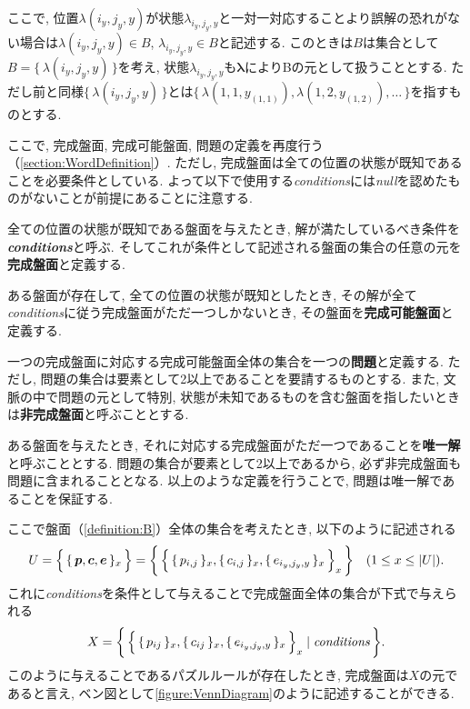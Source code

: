 ここで, 位置$\lambda(i_y,j_y,y)$が状態$\lambda_{i_y,j_y,y}$と一対一対応することより誤解の恐れがない場合は$\lambda(i_y,j_y,y) \in B  $, $\lambda_{i_y,j_y,y}\in B $と記述する.
このときは$B$は集合として$B=\{\,\lambda(i_y,j_y,y)\,\}$を考え, 状態$\lambda_{i_y,j_y,y}$も$\bm{\lambda}$によりBの元として扱うこととする.
ただし前と同様$\{\,\lambda(i_y,j_y,y)\,\}$とは$\{\,\lambda(1,1,y_{(1,1)}), \lambda(1,2,y_{(1,2)}),\ldots\,\}$を指すものとする.



ここで, 完成盤面, 完成可能盤面, 問題の定義を再度行う（\cref{section:WordDefinition}）. ただし, 完成盤面は全ての位置の状態が既知であることを必要条件としている. よって以下で使用する\textit{conditions}には\textit{null}を認めたものがないことが前提にあることに注意する.
\begin{definition}\label{definition:Conditions}
  全ての位置の状態が既知である盤面を与えたとき, 解が満たしているべき条件を\textbf{\textit{conditions}}と呼ぶ. そしてこれが条件として記述される盤面の集合の任意の元を\textbf{完成盤面}と定義する.
\end{definition}

\begin{definition}[完成可能盤面]
  ある盤面が存在して, 全ての位置の状態が既知としたとき, その解が全て\textit{conditions}に従う完成盤面がただ一つしかないとき, その盤面を\textbf{完成可能盤面}と定義する.
\end{definition}

\begin{definition}[問題と非完成盤面]
  一つの完成盤面に対応する完成可能盤面全体の集合を一つの\textbf{問題}と定義する. ただし, 問題の集合は要素として2以上であることを要請するものとする. また, 文脈の中で問題の元として特別, 状態が未知であるものを含む盤面を指したいときは\textbf{非完成盤面}と呼ぶこととする.
\end{definition}

ある盤面を与えたとき, それに対応する完成盤面がただ一つであることを\textbf{唯一解}と呼ぶこととする. 問題の集合が要素として2以上であるから, 必ず非完成盤面も問題に含まれることとなる.
以上のような定義を行うことで, 問題は唯一解であることを保証する.

ここで盤面（\cref{definition:B}）全体の集合を考えたとき, 以下のように記述される
\begin{equation}\label{equation:U}
  U=\Bigl\{\,\{\,\bm{p},\bm{c},\bm{e}\,\}_x\,\Bigr\}=\biggl\{\,\Bigl\{\,\{\,p_{i,j}\,\}_x,\{\,c_{i,j}\,\}_x,\{\,e_{i_y,j_y,y}\,\}_x\,\Bigr\}_x\,\biggr\} \quad (1\le x \le |U|).
\end{equation}
これに\textit{conditions}を条件として与えることで完成盤面全体の集合が下式で与えられる
\begin{equation}\label{equation:X}
  X=\biggl\{\,\Bigl\{\,\{\,p_{ij}\,\}_x,\{\,c_{ij}\,\}_x,\{\,e_{i_y,j_y,y}\,\}_x\,\Bigr\}_x\mid \rm{\textit{conditions}}\,\biggr\}.
\end{equation}
このように与えることであるパズルルールが存在したとき, 完成盤面は$X$の元であると言え, ベン図として\cref{figure:VennDiagram}のように記述することができる.

